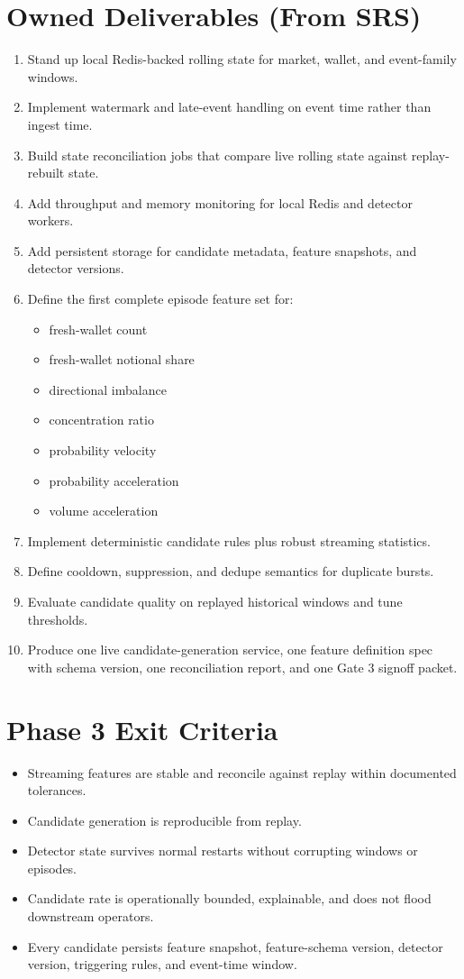\documentclass{article}
\begin{document}
\section*{Owned Deliverables (From SRS)}
\begin{enumerate}
\item Stand up local Redis-backed rolling state for market, wallet, and event-family windows.
\item Implement watermark and late-event handling on event time rather than ingest time.
\item Build state reconciliation jobs that compare live rolling state against replay-rebuilt state.
\item Add throughput and memory monitoring for local Redis and detector workers.
\item Add persistent storage for candidate metadata, feature snapshots, and detector versions.
\item Define the first complete episode feature set for:
\begin{itemize}
\item fresh-wallet count
\item fresh-wallet notional share
\item directional imbalance
\item concentration ratio
\item probability velocity
\item probability acceleration
\item volume acceleration
\end{itemize}
\item Implement deterministic candidate rules plus robust streaming statistics.
\item Define cooldown, suppression, and dedupe semantics for duplicate bursts.
\item Evaluate candidate quality on replayed historical windows and tune thresholds.
\item Produce one live candidate-generation service, one feature definition spec with schema version, one reconciliation report, and one Gate 3 signoff packet.
\end{enumerate}

\section*{Phase 3 Exit Criteria}
\begin{itemize}
\item Streaming features are stable and reconcile against replay within documented tolerances.
\item Candidate generation is reproducible from replay.
\item Detector state survives normal restarts without corrupting windows or episodes.
\item Candidate rate is operationally bounded, explainable, and does not flood downstream operators.
\item Every candidate persists feature snapshot, feature-schema version, detector version, triggering rules, and event-time window.
\end{itemize}
\end{document}

